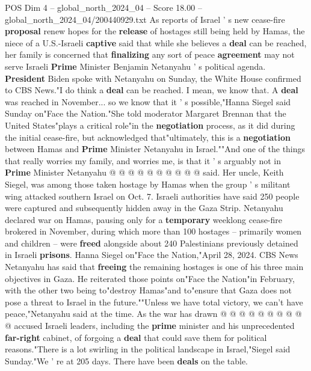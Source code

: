 \begin{textsample}{POS Dim 4 – global\_north\_2024\_04 – Score 18.00 – global\_north\_2024\_04/200440929.txt}  \label{ex:f4_pos_369}
As reports of Israel ' s new cease-fire \textbf{proposal} renew hopes for the \textbf{release} of hostages still being held by Hamas, the niece of a U.S.-Israeli \textbf{captive} said that while she believes a \textbf{deal} can be reached, her family is concerned that \textbf{finalizing} any sort of peace \textbf{agreement} may not serve Israeli \textbf{Prime} Minister Benjamin Netanyahu ' s political agenda. \textbf{President} Biden spoke with Netanyahu on Sunday, the White House confirmed to CBS News."I do think a \textbf{deal} can be reached.
I mean, we know that.
A \textbf{deal} was reached in November... so we know that it ' s possible,"Hanna Siegel said Sunday on"Face the Nation."She told moderator Margaret Brennan that the United States"plays a critical role"in the \textbf{negotiation} process, as it did during the initial cease-fire, but acknowledged that"ultimately, this is a \textbf{negotiation} between Hamas and \textbf{Prime} Minister Netanyahu in Israel.""And one of the things that really worries my family, and worries me, is that it ' s arguably not in \textbf{Prime} Minister Netanyahu @ @ @ @ @ @ @ @ @ @ said.
Her uncle, Keith Siegel, was among those taken hostage by Hamas when the group ' s militant wing attacked southern Israel on Oct. 7.
Israeli authorities have said 250 people were captured and subsequently hidden away in the Gaza Strip.
Netanyahu declared war on Hamas, pausing only for a \textbf{temporary} weeklong cease-fire brokered in November, during which more than 100 hostages -- primarily women and children -- were \textbf{freed} alongside about 240 Palestinians previously detained in Israeli \textbf{prisons}.
Hanna Siegel on"Face the Nation,"April 28, 2024.
CBS News Netanyahu has said that \textbf{freeing} the remaining hostages is one of his three main objectives in Gaza.
He reiterated those points on"Face the Nation"in February, with the other two being to"destroy Hamas"and to"ensure that Gaza does not pose a threat to Israel in the future.""Unless we have total victory, we can't have peace,"Netanyahu said at the time.
As the war has drawn @ @ @ @ @ @ @ @ @ @ accused Israeli leaders, including the \textbf{prime} minister and his unprecedented \textbf{far-right} cabinet, of forgoing a \textbf{deal} that could save them for political reasons."There is a lot swirling in the political landscape in Israel,"Siegel said Sunday."We ' re at 205 days.
There have been \textbf{deals} on the table.

\end{textsample}
